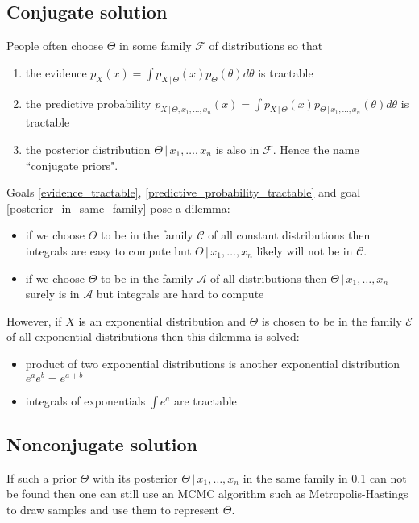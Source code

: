 \documentclass[14pt, reqno]{amsart}
\theoremstyle{definition}
\begin{document}
\subsection{Conjugate solution} \label{conjugate_solution} People often choose $\Theta$ in some family $\mathcal{F}$ of distributions so that
\begin{enumerate}[1.]
\item \label{evidence_tractable} the evidence $p_X(x) = \int p_{X \,|\, \Theta}(x) p_{\Theta}(\theta) d \theta$ is tractable
\item \label{predictive_probability_tractable} the predictive probability $p_{X \,|\, \Theta, x_1, \dots, x_n} (x) = \int p_{X \,|\, \Theta}(x) p_{\Theta \,|\, x_1, \dots, x_n}(\theta) d \theta$ is tractable
\item \label{posterior_in_same_family} the posterior distribution $\Theta \,|\, x_1, \dots, x_n$ is also in $\mathcal{F}$. Hence the name ``conjugate priors".
\end{enumerate}

Goals \ref{evidence_tractable}, \ref{predictive_probability_tractable} and goal \ref{posterior_in_same_family} pose a dilemma:
\begin{itemize}
\item if we choose $\Theta$ to be in the family $\mathcal{C}$ of all constant distributions then integrals are easy to compute but $\Theta \,|\, x_1, \dots, x_n$ likely will not be in $\mathcal{C}$.
\item if we choose $\Theta$ to be in the family $\mathcal{A}$ of all distributions then $\Theta \,|\, x_1, \dots, x_n$ surely is in $\mathcal{A}$ but integrals are hard to compute
\end{itemize}

However, if $X$ is an exponential distribution and $\Theta$ is chosen to be in the family $\mathcal{E}$ of all exponential distributions then this dilemma is solved:
\begin{itemize} 
\item product of two exponential distributions is another exponential distribution $e^a e^b = e^{a + b}$
\item integrals of exponentials $\int e^a$ are tractable
\end{itemize}

\subsection{Nonconjugate solution} \label{nonconjugate_solution} If such a prior $\Theta$ with its posterior $\Theta \,|\, x_1, \dots , x_n$ in the same family in \ref{conjugate_solution} can not be found then one can still use an MCMC algorithm such as Metropolis-Hastings to draw samples and use them to represent $\Theta$. 
\end{document}
